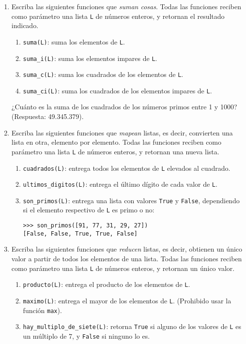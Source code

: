 \documentclass[10pt,spanish]{article}
\begin{document}
\begin{enumerate}
    \item
      Escriba las siguientes funciones que \emph{suman cosas}.
      Todas las funciones reciben como parámetro una lista \verb+L+
      de números enteros, y retornan el resultado indicado.
      \begin{enumerate}
        \item \lstinline!suma(L)!:
          suma los elementos de \verb+L+.
        \item \lstinline!suma_i(L)!:
          suma los elementos impares de \verb+L+.
        \item \lstinline!suma_c(L)!:
          suma los cuadrados de los elementos de \verb+L+.
        \item \lstinline!suma_ci(L)!:
          suma los cuadrados de los elementos impares de \verb+L+.
      \end{enumerate}
      ¿Cuánto es la suma de los cuadrados de los números primos entre 1 y 1000?
      (Respuesta: 49.345.379).

    \item
      Escriba las siguientes funciones que \emph{mapean} listas,
      es decir, convierten una lista en otra, elemento por elemento.
      Todas las funciones reciben como parámetro una lista \verb+L+
      de números enteros, y retornan una nueva lista.
      \begin{enumerate}
        \item \lstinline!cuadrados(L)!:
          entrega todos los elementos de \verb+L+ elevados al cuadrado.
        \item \lstinline!ultimos_digitos(L)!:
          entrega el último dígito de cada valor de \verb+L+.
        \item \lstinline!son_primos(L)!:
          entrega una lista con valores \lstinline+True+ y \lstinline+False+,
          dependiendo si el elemento respectivo de \verb+L+ es primo o no:
\begin{lstlisting}
>>> son_primos([91, 77, 31, 29, 27])
[False, False, True, True, False]
\end{lstlisting}
      \end{enumerate}

    \item
      Escriba las siguientes funciones que \emph{reducen} listas,
      es decir, obtienen un único valor a partir de todos los elementos de una lista.
      Todas las funciones reciben como parámetro una lista \verb+L+
      de números enteros, y retornan un único valor.
      \begin{enumerate}
        \item \lstinline!producto(L)!:
          entrega el producto de los elementos de \verb+L+.
        \item \lstinline!maximo(L)!:
          entrega el mayor de los elementos de \verb+L+.
          (Prohibido usar la función \lstinline+max+).
        \item \lstinline!hay_multiplo_de_siete(L)!:
          retorna \lstinline+True+ si alguno de los valores de \verb+L+
          es un múltiplo de 7, y \lstinline+False+ si ninguno lo es.
      \end{enumerate}


\end{enumerate}
\end{document}
